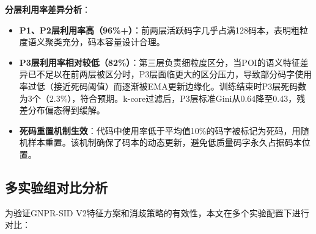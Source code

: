 \textbf{分层利用率差异分析}：

\begin{itemize}
    \item \textbf{P1、P2层利用率高（96\%+）}：前两层活跃码字几乎占满128码本，表明粗粒度语义聚类充分，码本容量设计合理。
    \item \textbf{P3层利用率相对较低（82\%）}：第三层负责细粒度区分，当POI的语义特征差异已不足以在前两层被区分时，P3层面临更大的区分压力，导致部分码字使用率过低（接近死码阈值）而逐渐被EMA更新边缘化。训练结束时P3层死码数为3个（2.3\%），符合预期。k-core过滤后，P3层标准Gini从0.64降至0.43，残差分布偏态得到缓解。
    \item \textbf{死码重置机制生效}：代码中使用率低于平均值10\%的码字被标记为死码，用随机样本重置。该机制确保了码本的动态更新，避免低质量码字永久占据码本位置。
\end{itemize}

\subsection{多实验组对比分析}
\label{sec:multi_exp_comparison}

为验证GNPR-SID V2特征方案和消歧策略的有效性，本文在多个实验配置下进行对比：

\begin{table}[H]
\centering
\small
\caption{多实验组配置与效果对比}
\label{tab:multi_exp}
\end{table}

